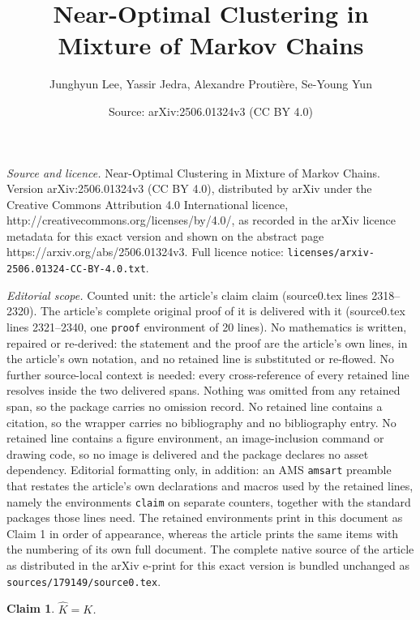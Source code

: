 \documentclass[10pt,a4paper]{amsart}
\title{Near-Optimal Clustering in Mixture of Markov Chains}
\author{Junghyun Lee, Yassir Jedra, Alexandre Prouti\`ere, Se-Young Yun}
\date{Source: arXiv:2506.01324v3 (CC BY 4.0)}
\newtheorem{claim}{Claim}
\begin{document}
\maketitle

\noindent\emph{Source and licence.} Near-Optimal Clustering in Mixture of Markov Chains. Version arXiv:2506.01324v3 (CC BY 4.0), distributed by arXiv under the Creative Commons Attribution 4.0 International licence, http://creativecommons.org/licenses/by/4.0/, as recorded in the arXiv licence metadata for this exact version and shown on the abstract page https://arxiv.org/abs/2506.01324v3. Full licence notice: \texttt{licenses/arxiv-2506.01324-CC-BY-4.0.txt}.\par\smallskip

\noindent\textit{Editorial scope.} Counted unit: the article's claim claim (source0.tex lines 2318--2320). The article's complete original proof of it is delivered with it (source0.tex lines 2321--2340, one \texttt{proof} environment of 20 lines). No mathematics is written, repaired or re-derived: the statement and the proof are the article's own lines, in the article's own notation, and no retained line is substituted or re-flowed.  No further source-local context is needed: every cross-reference of every retained line resolves inside the two delivered spans.  Nothing was omitted from any retained span, so the package carries no omission record.  No retained line contains a citation, so the wrapper carries no bibliography and no bibliography entry.  No retained line contains a figure environment, an image-inclusion command or drawing code, so no image is delivered and the package declares no asset dependency.  Editorial formatting only, in addition: an AMS \texttt{amsart} preamble that restates the article's own declarations and macros used by the retained lines, namely the environments \texttt{claim} on separate counters, together with the standard packages those lines need.  The retained environments print in this document as Claim 1 in order of appearance, whereas the article prints the same items with the numbering of its own full document.  The complete native source of the article as distributed in the arXiv e-print for this exact version is bundled unchanged as \texttt{sources/179149/source0.tex}.
\begin{claim}
    $\widehat{K} = K$.
\end{claim}
\end{document}
